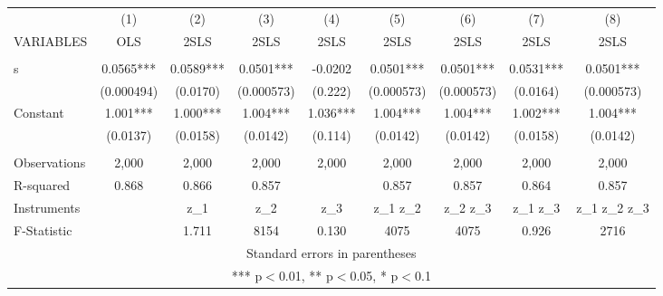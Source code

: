 \begin{tabular}{lcccccccc} \hline
 & (1) & (2) & (3) & (4) & (5) & (6) & (7) & (8) \\
VARIABLES & OLS & 2SLS & 2SLS & 2SLS & 2SLS & 2SLS & 2SLS & 2SLS \\ \hline
 &  &  &  &  &  &  &  &  \\
s & 0.0565*** & 0.0589*** & 0.0501*** & -0.0202 & 0.0501*** & 0.0501*** & 0.0531*** & 0.0501*** \\
 & (0.000494) & (0.0170) & (0.000573) & (0.222) & (0.000573) & (0.000573) & (0.0164) & (0.000573) \\
Constant & 1.001*** & 1.000*** & 1.004*** & 1.036*** & 1.004*** & 1.004*** & 1.002*** & 1.004*** \\
 & (0.0137) & (0.0158) & (0.0142) & (0.114) & (0.0142) & (0.0142) & (0.0158) & (0.0142) \\
 &  &  &  &  &  &  &  &  \\
Observations & 2,000 & 2,000 & 2,000 & 2,000 & 2,000 & 2,000 & 2,000 & 2,000 \\
R-squared & 0.868 & 0.866 & 0.857 &  & 0.857 & 0.857 & 0.864 & 0.857 \\
Instruments &  & z\_1 & z\_2 & z\_3 & z\_1 z\_2 & z\_2 z\_3 & z\_1 z\_3 & z\_1 z\_2 z\_3 \\
 F-Statistic &  & 1.711 & 8154 & 0.130 & 4075 & 4075 & 0.926 & 2716 \\ \hline
\multicolumn{9}{c}{ Standard errors in parentheses} \\
\multicolumn{9}{c}{ *** p$<$0.01, ** p$<$0.05, * p$<$0.1} \\
\end{tabular}
